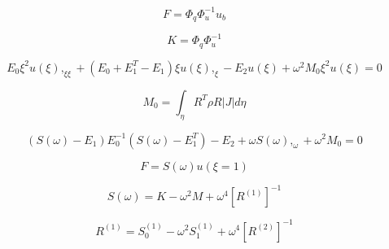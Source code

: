 \begin{equation}
    F = \Phi_q \Phi_u^{-1} u_b
    \label{lr_eq:sbfem_kmat_previous}
\end{equation}

\begin{equation}
    K = \Phi_q \Phi_u^{-1}
    \label{lr_eq:sbfem_kmat}
\end{equation}

\begin{equation}
    E_0 \xi^2 u(\xi),_{\xi\xi} +
    (E_0 + E_1^T - E_1)\xi u(\xi),_{\xi} -
    E_2 u(\xi) + \omega^2 M_0 \xi^2 u(\xi) = 0
    \label{lr_eq:sbfem_dynamic}
\end{equation}

\begin{equation}
    M_0 = \int_\eta R^T \rho R|J| d\eta
    \label{lr_eq:sbfem_dynamic_mass}
\end{equation}

\begin{equation}
    (S(\omega)-E_1)E_0^{-1}
    (S(\omega)-E_1^T) - E_2 +
    \omega S(\omega),_\omega + \omega^2 M_0 = 0
    \label{lr_eq:sbfem_dynamic_1stODE}
\end{equation}

\begin{equation}
    F = S(\omega) u(\xi=1)
    \label{lr_eq:sbfem_dynamic_nodal_force}
\end{equation}

\begin{equation}
    S(\omega) = K - \omega^2 M + \omega^4 \left[
        R^{(1)}    
    \right]^{-1}
    \label{lr_eq:sbfem_dynamic_stiffness}
\end{equation}

\begin{equation}
    R^{(1)} = S_0^{(1)} - \omega^2 S_1^{(1)} + \omega^4 [R^{(2)}]^{-1}
    \label{lr_eq:sbfem_dynamic_R}
\end{equation}


